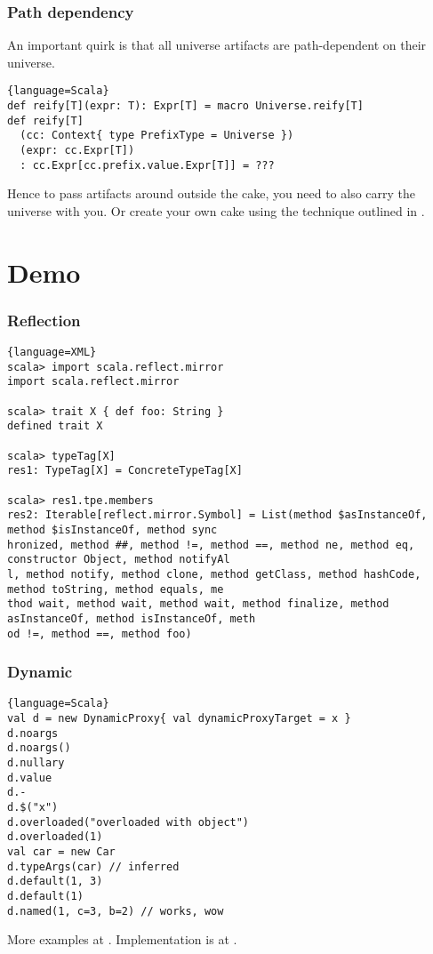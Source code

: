 \documentclass[hyperref={bookmarks=false}]{beamer}
\begin{document}
\begin{frame}[fragile]
\frametitle{Path dependency}

An important quirk is that all universe artifacts are path-dependent on their universe.

\begin{lstlisting}{language=Scala}
def reify[T](expr: T): Expr[T] = macro Universe.reify[T]
def reify[T]
  (cc: Context{ type PrefixType = Universe })
  (expr: cc.Expr[T])
  : cc.Expr[cc.prefix.value.Expr[T]] = ???
\end{lstlisting}

Hence to pass artifacts around outside the cake, you need to also carry the universe with you.
Or create your own cake using the technique outlined in
.
\end{frame}

\section{Demo}

\begin{frame}[fragile]
\frametitle{Reflection}

\begin{lstlisting}{language=XML}
scala> import scala.reflect.mirror
import scala.reflect.mirror

scala> trait X { def foo: String }
defined trait X

scala> typeTag[X]
res1: TypeTag[X] = ConcreteTypeTag[X]

scala> res1.tpe.members
res2: Iterable[reflect.mirror.Symbol] = List(method $asInstanceOf, method $isInstanceOf, method sync
hronized, method ##, method !=, method ==, method ne, method eq, constructor Object, method notifyAl
l, method notify, method clone, method getClass, method hashCode, method toString, method equals, me
thod wait, method wait, method wait, method finalize, method asInstanceOf, method isInstanceOf, meth
od !=, method ==, method foo)
\end{lstlisting}
\end{frame}

\begin{frame}[fragile]
\frametitle{Dynamic}

\begin{lstlisting}{language=Scala}
val d = new DynamicProxy{ val dynamicProxyTarget = x }
d.noargs
d.noargs()
d.nullary
d.value
d.-
d.$("x")
d.overloaded("overloaded with object")
d.overloaded(1)
val car = new Car
d.typeArgs(car) // inferred
d.default(1, 3)
d.default(1)
d.named(1, c=3, b=2) // works, wow
\end{lstlisting}

More examples at .
Implementation is at .

\end{frame}
\end{document}
